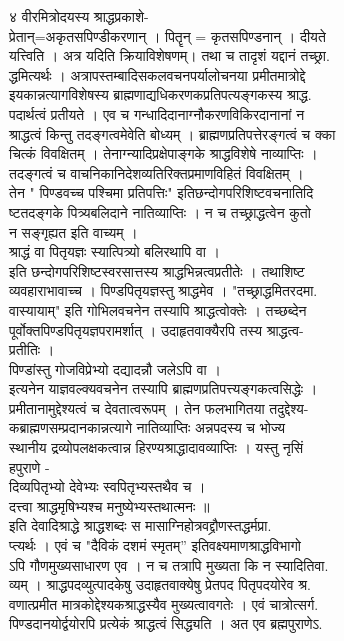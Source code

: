 \documentclass[11pt, openany]{book}
\begin{document}
{{{{{{{{{{{{{{{{ }{४ }{ वीरमित्रोदयस्य श्राद्धप्रकाशे-}{\\
प्रेतान्=अकृतसपिण्डीकरणान् । पितॄन् = कृतसपिण्डनान् । }{दीयते}{\\
यत्त्विति । अत्र यदिति क्रियाविशेषणम्। तथा च तादृशं यद्दानं तच्छ्रा.\\
द्धमित्यर्थः । अत्रापस्तम्बादिसकलवचनपर्यालोचनया प्रमीतमात्रोद्दे\\
इयकान्नत्यागविशेषस्य ब्राह्मणाद्यधिकरणकप्रतिपत्यङ्गकस्य श्राद्ध.\\
पदार्थत्वं प्रतीयते । एव च गन्धादिदानाग्नौकरणविकिरदानानां न\\
श्राद्धत्वं किन्तु तदङ्गत्वमेवेति बोध्यम् । ब्राह्मणप्रतिपत्तेरङ्गत्वं च
क्का\\
चित्कं विवक्षितम् । तेनाग्न्यादिप्रक्षेपाङ्गके श्राद्धविशेषे नाव्याप्तिः
।\\
तदङ्गत्वं च वाचनिकानिदेशव्यतिरिक्तप्रमाणविहितं विवक्षितम् ।\\
तेन " पिण्डवच्च पश्चिमा प्रतिपत्तिः" इतिछन्दोगपरिशिष्टवचनातिदि\\
ष्टतदङ्गके पित्र्यबलिदाने नातिव्याप्तिः । न च तच्छ्राद्धत्वेन कुतो\\
न सङ्गृह्यत इति वाच्यम् ।\\
श्राद्धं वा पितृयज्ञः स्यात्पित्र्यो बलिरथापि वा ।\\
इति छन्दोगपरिशिष्टस्वरसात्तस्य श्राद्धभिन्नत्वप्रतीतेः । तथाशिष्ट\\
व्यवहाराभावाच्च । पिण्डपितृयज्ञस्तु श्राद्धमेव । "तच्छ्राद्धमितरदमा.\\
वास्यायाम्" इति गोभिलवचनेन तस्यापि श्राद्धत्वोक्तेः । तच्छब्देन\\
पूर्वोक्तपिण्डपितृयज्ञपरामर्शात् । उदाहृतवाक्यैरपि तस्य श्राद्धत्व-\\
प्रतीतिः ।\\
पिण्डांस्तु गोजविप्रेभ्यो दद्यादन्नौ जलेऽपि वा ।\\
इत्यनेन याज्ञवल्क्यवचनेन तस्यापि ब्राह्मणप्रतिपत्त्यङ्गकत्वसिद्धेः ।\\
प्रमीतानामुद्देश्यत्वं च देवतात्वरूपम् । तेन फलभागितया तदुद्देश्य-\\
कब्राह्मणसम्प्रदानकान्नत्यागे नातिव्याप्तिः \textbar{} अन्नपदस्य च
भोज्य\\
स्थानीय द्रव्योपलक्षकत्वान्न हिरण्यश्राद्धादावव्याप्तिः । यस्तु नृसिं\\
हपुराणे -\\
दिव्यपितृभ्यो देवेभ्यः स्वपितृभ्यस्तथैव च ।\\
दत्त्वा श्राद्धमृषिभ्यश्च मनुष्येभ्यस्तथात्मनः ॥\\
इति देवादिश्राद्धे श्राद्धशब्दः स मासाग्निहोत्रवद्द्रौणस्तद्धर्मप्रा.\\
प्त्यर्थः । एवं च "दैविकं दशमं स्मृतम्'' इतिवक्ष्यमाणश्राद्धविभागो\\
ऽपि गौणमुख्यसाधारण एव । न च तत्रापि मुख्यता कि न स्यादितिवा.\\
व्यम् । श्राद्धपदव्युत्पादकेषु उदाहृतवाक्येषु प्रेतपद पितृपदयोरेव श्र.\\
वणात्प्रमीत मात्रकोद्देश्यकश्राद्धस्यैव मुख्यत्वावगतेः । एवं
चात्रोत्सर्ग.\\
पिण्डदानयोर्द्वयोरपि प्रत्येकं श्राद्धत्वं सिद्ध्यति । अत एव
ब्रह्मपुराणेऽ.\\


}}}}}}}}}}}}}}}}
\end{document}
